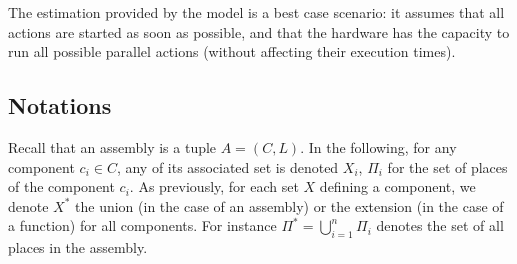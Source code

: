 
The estimation provided by the model is a best case scenario: it
assumes that all actions are started as soon as possible, and that the
hardware has the capacity to run all possible parallel actions
(without affecting their execution times).

\subsection{Notations}



Recall that an assembly is a tuple $A = (C,L)$. In the following, for
any component $c_i \in C$, any of its associated set is denoted
$X_i$, \eg $\Pi_i$ for the set of places of the component $c_i$.  As
previously, for each set $X$ defining a component, we denote $X^*$ the
union (in the case of an assembly) or the extension (in the case of a
function) for all components. For instance
$\Pi^*=\bigcup_{i=1}^{n}\Pi_i$ denotes the set of all places in the
assembly.

